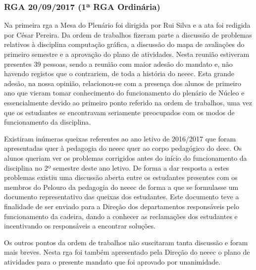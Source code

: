 
\subsubsection{RGA 20/09/2017 (1ª RGA Ordinária)}

Na primeira \acrshort{rga} a Mesa do Plenário foi dirigida por Rui Silva e a ata foi redigida por César Pereira. Da ordem de trabalhos fizeram parte a discussão de problemas relativos à disciplina computação gráfica, a discussão do mapa de avaliações do primeiro semestre e a aprovação do plano de atividades. Nesta reunião estiveram presentes 39 pessoas, sendo a reunião com maior adesão do mandato e, não havendo registos que o contrariem, de toda a história do \acrshort{neeec}. Esta grande adesão, na nossa opinião, relacionou-se com a presença dos alunos de primeiro ano que vieram tomar conhecimento do funcionamento do plenário de Núcleo e essencialmente devido ao primeiro ponto referido na ordem de trabalhos, uma vez que os estudantes se encontravam seriamente preocupados com os modos de funcionamento da disciplina.

Existiram inúmeras queixas referentes ao ano letivo de 2016/2017 que foram apresentadas quer à pedagogia do \acrshort{neeec} quer ao corpo pedagógico do \acrshort{deec}. Os alunos queriam ver os problemas corrigidos antes do início do funcionamento da disciplina no 2º semestre deste ano letivo. De forma a dar resposta a estes problemas existiu uma discussão aberta entre os estudantes presentes com os membros do Pelouro da pedagogia do \acrshort{neeec} de forma a que se formulasse um documento representativo das queixas dos estudantes. Este documento teve a finalidade de ser enviado para a Direção dos departamentos responsáveis pelo funcionamento da cadeira, dando a conhecer as reclamações dos estudantes e incentivando os responsáveis a encontrar soluções.

Os outros pontos da ordem de trabalhos não suscitaram tanta discussão e foram mais breves. Nesta \acrshort{rga} foi também apresentado pela Direção do \acrshort{neeec} o plano de atividades para o presente mandato que foi aprovado por unanimidade.